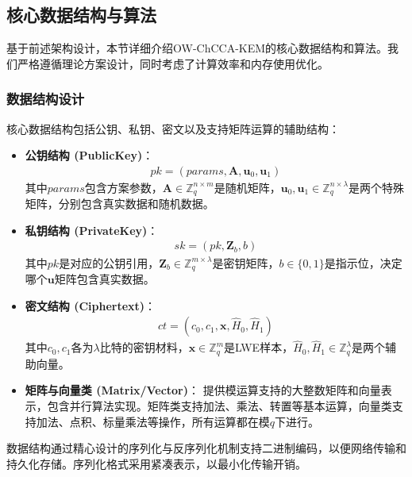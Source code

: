 \subsection{核心数据结构与算法}

基于前述架构设计，本节详细介绍OW-ChCCA-KEM的核心数据结构和算法。我们严格遵循理论方案设计，同时考虑了计算效率和内存使用优化。

\subsubsection{数据结构设计}

核心数据结构包括公钥、私钥、密文以及支持矩阵运算的辅助结构：

\begin{itemize}
    \item \textbf{公钥结构 (PublicKey)}：
    \begin{align}
    pk = (params, \mathbf{A}, \mathbf{u}_0, \mathbf{u}_1)
    \end{align}
    其中$params$包含方案参数，$\mathbf{A} \in \mathbb{Z}_q^{n \times m}$是随机矩阵，$\mathbf{u}_0, \mathbf{u}_1 \in \mathbb{Z}_q^{n \times \lambda}$是两个特殊矩阵，分别包含真实数据和随机数据。
    
    \item \textbf{私钥结构 (PrivateKey)}：
    \begin{align}
    sk = (pk, \mathbf{Z}_b, b)
    \end{align}
    其中$pk$是对应的公钥引用，$\mathbf{Z}_b \in \mathbb{Z}_q^{m \times \lambda}$是密钥矩阵，$b \in \{0,1\}$是指示位，决定哪个$\mathbf{u}$矩阵包含真实数据。
    
    \item \textbf{密文结构 (Ciphertext)}：
    \begin{align}
    ct = (c_0, c_1, \mathbf{x}, \hat{H}_0, \hat{H}_1)
    \end{align}
    其中$c_0, c_1$各为$\lambda$比特的密钥材料，$\mathbf{x} \in \mathbb{Z}_q^m$是LWE样本，$\hat{H}_0, \hat{H}_1 \in \mathbb{Z}_q^\lambda$是两个辅助向量。
    
    \item \textbf{矩阵与向量类 (Matrix/Vector)}：
    提供模运算支持的大整数矩阵和向量表示，包含并行算法实现。矩阵类支持加法、乘法、转置等基本运算，向量类支持加法、点积、标量乘法等操作，所有运算都在模$q$下进行。
\end{itemize}

数据结构通过精心设计的序列化与反序列化机制支持二进制编码，以便网络传输和持久化存储。序列化格式采用紧凑表示，以最小化传输开销。


